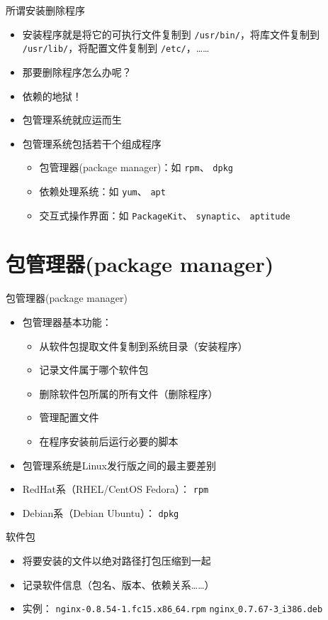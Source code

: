 \documentclass[CJK,xetex]{beamer}
\newcommand{\mydir}[1]{{\color{red} \texttt{#1}}}
\newcommand{\myfile}[1]{{\color{purple} \texttt{#1}}}
\begin{document}
\begin{frame}{所谓安装删除程序}
  \begin{itemize}[<+->]
  \item 安装程序就是将它的可执行文件复制到\mydir{/usr/bin/}，将库文件复制到\mydir{/usr/lib/}，将配置文件复制到\mydir{/etc/}，……
  \item 那要删除程序怎么办呢？
    \item 依赖的地狱！
    \item 包管理系统就应运而生
    \item 包管理系统包括若干个组成程序
      \begin{itemize}
      \item 包管理器(package manager)：如\myfile{rpm}、\myfile{dpkg}
      \item 依赖处理系统：如\myfile{yum}、\myfile{apt}
      \item 交互式操作界面：如\myfile{PackageKit}、\myfile{synaptic}、\myfile{aptitude}
      \end{itemize}
  \end{itemize}
\end{frame}

\section{包管理器(package manager)}

\begin{frame}{包管理器(package manager)}
\begin{itemize}[<+->]
  \item 包管理器基本功能：
  \begin{itemize}
    \item 从软件包提取文件复制到系统目录（安装程序）
    \item 记录文件属于哪个软件包
    \item 删除软件包所属的所有文件（删除程序）
    \item 管理配置文件
    \item 在程序安装前后运行必要的脚本
    \end{itemize}
    \item 包管理系统是Linux发行版之间的最主要差别
  \item RedHat系（RHEL/CentOS Fedora）：\myfile{rpm}
    \item Debian系（Debian Ubuntu）：\myfile{dpkg}
\end{itemize}
\end{frame}

\begin{frame}{软件包}
\begin{itemize}[<+->]
  \item 将要安装的文件以绝对路径打包压缩到一起
  \item 记录软件信息（包名、版本、依赖关系……）
  \item 实例：\myfile{nginx-0.8.54-1.fc15.x86$\_$64.rpm} \myfile{nginx$\_$0.7.67-3$\_$i386.deb}
\end{itemize}
\end{frame}
\end{document}
